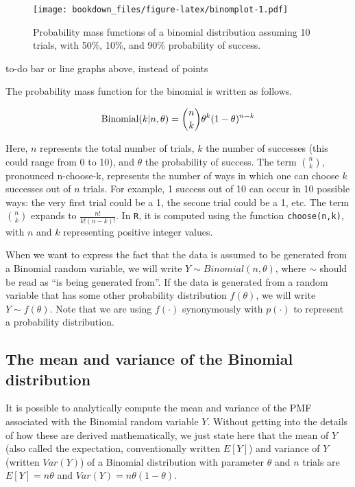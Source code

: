 \documentclass[12pt,]{krantz}
\makeatletter
\newenvironment{kframe}{%
\medskip{}
\setlength{\fboxsep}{.8em}
 \def\at@end@of@kframe{}%
 \ifinner\ifhmode%
  \def\at@end@of@kframe{\end{minipage}}%
  \begin{minipage}{\columnwidth}%
 \fi\fi%
 \def\FrameCommand##1{\hskip\@totalleftmargin \hskip-\fboxsep
 \colorbox{shadecolor}{##1}\hskip-\fboxsep
     \hskip-\linewidth \hskip-\@totalleftmargin \hskip\columnwidth}%
 \MakeFramed {\advance\hsize-\width
   \@totalleftmargin\z@ \linewidth\hsize
   \@setminipage}}%
 {\par\unskip\endMakeFramed%
 \at@end@of@kframe}
\newenvironment{rmdblock}[1]
  {
  \begin{itemize}
  \renewcommand{\labelitemi}{
    \raisebox{-.7\height}[0pt][0pt]{
      {\setkeys{Gin}{width=3em,keepaspectratio}\texttt{[image: images/\#1]}}
    }
  }
  \setlength{\fboxsep}{1em}
  \begin{kframe}
  \item
  }
  {
  \end{kframe}
  \end{itemize}
  }
\newenvironment{rmdnote}
  {\begin{rmdblock}{note}}
  {\end{rmdblock}}
\theoremstyle{definition}
\theoremstyle{definition}
\theoremstyle{definition}
\theoremstyle{remark}
\makeatother
\begin{document}
\begin{figure}
\centering
\texttt{[image: bookdown\_files/figure-latex/binomplot-1.pdf]}
\caption{\label{fig:binomplot}Probability mass functions of a binomial
distribution assuming 10 trials, with 50\%, 10\%, and 90\% probability
of success.}
\end{figure}

\begin{rmdnote} to-do bar or line graphs above, instead of
points \end{rmdnote}

The probability mass function for the binomial is written as follows.

\begin{equation}
\hbox{Binomial}(k|n,\theta) = 
\binom{n}{k} \theta^{k} (1-\theta)^{n-k}
\end{equation}

Here, \(n\) represents the total number of trials, \(k\) the number of
successes (this could range from 0 to 10), and \(\theta\) the
probability of success. The term \(\binom{n}{k}\), pronounced
n-choose-k, represents the number of ways in which one can choose \(k\)
successes out of \(n\) trials. For example, 1 success out of 10 can
occur in 10 possible ways: the very first trial could be a 1, the secone
trial could be a 1, etc. The term \(\binom{n}{k}\) expands to
\(\frac{n!}{k!(n-k)!}\). In \texttt{R}, it is computed using the
function \texttt{choose(n,k)}, with \(n\) and \(k\) representing
positive integer values.

When we want to express the fact that the data is assumed to be
generated from a Binomial random variable, we will write
\(Y \sim Binomial(n,\theta)\), where \(\sim\) should be read as ``is
being generated from''. If the data is generated from a random variable
that has some other probability distribution \(f(\theta)\), we will
write \(Y\sim f(\theta)\). Note that we are using \(f(\cdot)\)
synonymously with \(p(\cdot)\) to represent a probability distribution.

\subsection{The mean and variance of the Binomial
distribution}\label{the-mean-and-variance-of-the-binomial-distribution}

It is possible to analytically compute the mean and variance of the PMF
associated with the Binomial random variable \(Y\). Without getting into
the details of how these are derived mathematically, we just state here
that the mean of \(Y\) (also called the expectation, conventionally
written \(E[Y]\)) and variance of \(Y\) (written \(Var(Y)\)) of a
Binomial distribution with parameter \(\theta\) and \(n\) trials are
\(E[Y] = n\theta\) and \(Var(Y) = n\theta (1-\theta)\).
\end{document}
